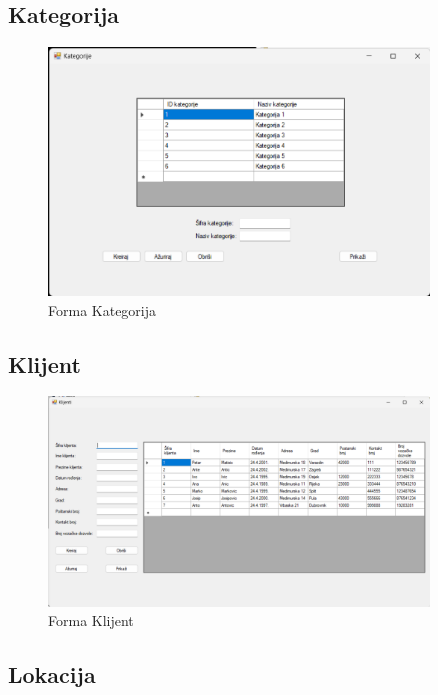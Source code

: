 \documentclass[]{foi}
\begin{document}
\subsection{Kategorija}

\begin{figure}[!ht]
    \centering
    \includegraphics[width=0.9\textwidth]{slike/kategorija.png}
    \caption{Forma Kategorija}
    \label{fig:kategorija}
\end{figure}

\subsection{Klijent}

\begin{figure}[!ht]
    \centering
    \includegraphics[width=0.9\textwidth]{slike/klijent.png}
    \caption{Forma Klijent}
    \label{fig:klijent}
\end{figure}
\newpage

\subsection{Lokacija}
\end{document}
